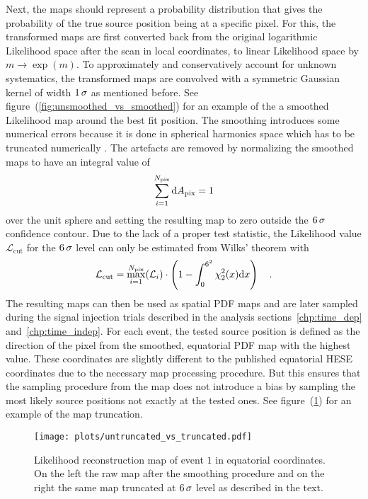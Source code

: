 Next, the maps should represent a probability distribution that gives the probability of the true source position being at a specific pixel.
For this, the transformed maps are first converted back from the original logarithmic Likelihood space after the scan in local coordinates, to linear Likelihood space by $m\rightarrow \exp{(m)}$.
To approximately and conservatively account for unknown systematics, the transformed maps are convolved with a symmetric Gaussian kernel of width $\num{1}\,\sigma$ as mentioned before.
See figure~(\ref{fig:unsmoothed_vs_smoothed}) for an example of the a smoothed Likelihood map around the best fit position.
The smoothing introduces some numerical errors because it is done in spherical harmonics space which has to be truncated numerically \cite{Gorski:2004by}.
The artefacts are removed by normalizing the smoothed maps to have an integral value of
\begin{equation}
  \sum_{i=1}^{N_\text{pix}} \mathrm{d}A_\text{pix} = 1
\end{equation}
over the unit sphere and setting the resulting map to zero outside the $\num{6}\,\sigma$ confidence contour.
Due to the lack of a proper test statistic, the Likelihood value $\mathcal{L}_\text{cut}$ for the $\num{6}\,\sigma$ level can only be estimated from Wilks' theorem with
\begin{equation}
  \mathcal{L}_\text{cut} =
    \max_{i=1}^{N_\text{pix}}(\mathcal{L}_i)\cdot
    \left(1 - \int_0^{6^2}\chi^2_{2}(x)\mathrm{d}x\right)
  \quad\text{.}
\end{equation}
The resulting maps can then be used as spatial PDF maps and are later sampled during the signal injection trials described in the analysis sections~\ref{chp:time_dep} and~\ref{chp:time_indep}.
For each event, the tested source position is defined as the direction of the pixel from the smoothed, equatorial PDF map with the highest value.
These coordinates are slightly different to the published equatorial HESE coordinates due to the necessary map processing procedure.
But this ensures that the sampling procedure from the map does not introduce a bias by sampling the most likely source positions not exactly at the tested ones.
See figure~(\ref{fig:untruncated_vs_truncated}) for an example of the map truncation.

\begin{figure}[htbp]
  \centering
  \texttt{[image: plots/untruncated\_vs\_truncated.pdf]}
  \caption[Likelihood reconstruction map truncation after smoothing]{
    Likelihood reconstruction map of event $1$ in equatorial coordinates.
    On the left the raw map after the smoothing procedure and on the right the same map truncated at $\num{6}\,\sigma$ level as described in the text.
  }
  \label{fig:untruncated_vs_truncated}
\end{figure}

